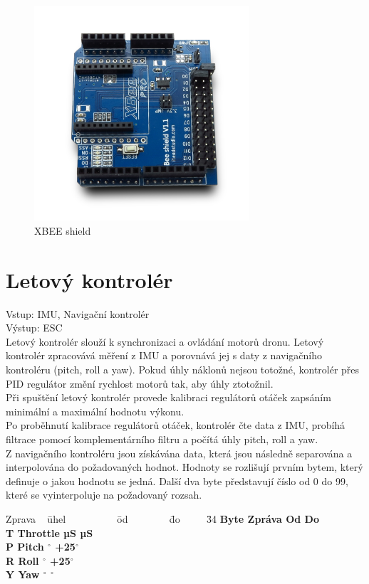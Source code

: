 \begin{figure}[h]
	\centering
	\includegraphics[width=8cm]{pictures/xbeeshield.jpg}
	\caption{XBEE shield}
\end{figure}


\section{Letový kontrolér} 
Vstup: IMU, Navigační kontrolér\\
Výstup: ESC\\

Letový kontrolér slouží k synchronizaci a ovládání motorů dronu. Letový kontrolér zpracovává měření z IMU a porovnává jej s daty z navigačního kontroléru (pitch, roll a yaw). Pokud úhly náklonů nejsou totožné, kontrolér přes PID regulátor změní rychlost motorů tak, aby úhly ztotožnil.\\
Při spuštění letový kontrolér provede kalibraci regulátorů otáček zapsáním minimální a maximální hodnotu výkonu.\\
Po proběhnutí kalibrace regulátorů otáček, kontrolér čte data z IMU, probíhá filtrace pomocí komplementárního filtru a počítá úhly pitch, roll a yaw.\\
Z navigačního kontroléru jsou získávána data, která jsou následně separována a interpolována do požadovaných hodnot. Hodnoty se rozlišují prvním bytem, který definuje o jakou hodnotu se jedná. Další dva byte představují číslo od 0 do 99, které se vyinterpoluje na požadovaný rozsah.\\

\begin{tabbing}
	Zprava ~ \= uhel ~~~~~~~~~ \= od ~~~~~~~ \= do ~~~~
	\= 34 \kill
	\bfseries Byte \>
	\bfseries Zpráva \>
	\bfseries Od \>
	\bfseries Do \\
	T\> Throttle  µS  µS \\
	P\> Pitch $^\circ$ \> +25$^\circ$   \\
	R\> Roll $^\circ$ \> +25$^\circ$ \\
	Y\> Yaw $^\circ$ $^\circ$ \\
\end{tabbing}

